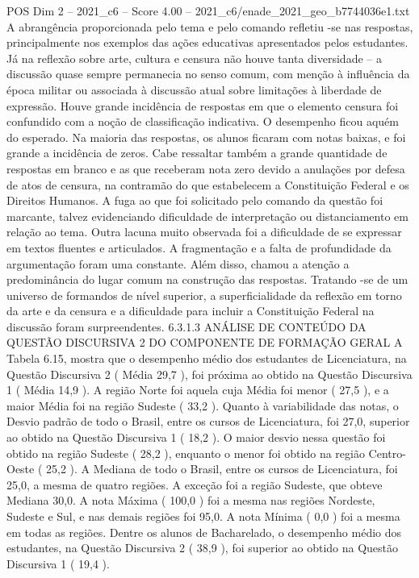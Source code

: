 \begin{textsample}{POS Dim 2 – 2021\_c6 – Score 4.00 – 2021\_c6/enade\_2021\_geo\_b7744036e1.txt}
A abrangência proporcionada pelo tema e pelo comando refletiu -se nas respostas, principalmente nos exemplos das ações educativas apresentados pelos estudantes.
Já na reflexão sobre arte, cultura e censura não houve tanta diversidade – a discussão quase sempre permanecia no senso comum, com menção à influência da época militar ou associada à discussão atual sobre limitações à liberdade de expressão.
Houve grande incidência de respostas em que o elemento censura foi confundido com a noção de classificação indicativa.
O desempenho ficou aquém do esperado.
Na maioria das respostas, os alunos ficaram com notas baixas, e foi grande a incidência de zeros.
Cabe ressaltar também a grande quantidade de respostas em branco e as que receberam nota zero devido a anulações por defesa de atos de censura, na contramão do que estabelecem a Constituição Federal e os Direitos Humanos.
A fuga ao que foi solicitado pelo comando da questão foi marcante, talvez evidenciando dificuldade de interpretação ou distanciamento em relação ao tema.
Outra lacuna muito observada foi a dificuldade de se expressar em textos fluentes e articulados.
A fragmentação e a falta de profundidade da argumentação foram uma constante.
Além disso, chamou a atenção a predominância do lugar comum na construção das respostas.
Tratando -se de um universo de formandos de nível superior, a superficialidade da reflexão em torno da arte e da censura e a dificuldade para incluir a Constituição Federal na discussão foram surpreendentes. 6.3.1.3 ANÁLISE DE CONTEÚDO DA QUESTÃO DISCURSIVA 2 DO COMPONENTE DE FORMAÇÃO GERAL A Tabela 6.15, mostra que o desempenho médio dos estudantes de Licenciatura, na Questão Discursiva 2 ( Média 29,7 ), foi próxima ao obtido na Questão Discursiva 1 ( Média 14,9 ).
A região Norte foi aquela cuja Média foi menor ( 27,5 ), e a maior Média foi na região Sudeste ( 33,2 ).
Quanto à variabilidade das notas, o Desvio padrão de todo o Brasil, entre os cursos de Licenciatura, foi 27,0, superior ao obtido na Questão Discursiva 1 ( 18,2 ).
O maior desvio nessa questão foi obtido na região Sudeste ( 28,2 ), enquanto o menor foi obtido na região Centro-Oeste ( 25,2 ).
A Mediana de todo o Brasil, entre os cursos de Licenciatura, foi 25,0, a mesma de quatro regiões.
A exceção foi a região Sudeste, que obteve Mediana 30,0.
A nota Máxima ( 100,0 ) foi a mesma nas regiões Nordeste, Sudeste e Sul, e nas demais regiões foi 95,0.
A nota Mínima ( 0,0 ) foi a mesma em todas as regiões.
Dentre os alunos de Bacharelado, o desempenho médio dos estudantes, na Questão Discursiva 2 ( 38,9 ), foi superior ao obtido na Questão Discursiva 1 ( 19,4 ).

\end{textsample}
